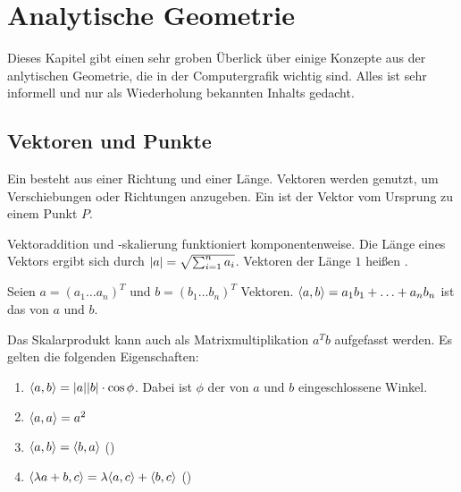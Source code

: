 \chapter{Analytische Geometrie}
Dieses Kapitel gibt einen sehr groben Überlick über einige Konzepte aus der anlytischen Geometrie, die in der Computergrafik wichtig sind.
Alles ist sehr informell und nur als Wiederholung bekannten Inhalts gedacht.

\section{Vektoren und Punkte}
Ein  besteht aus einer Richtung und einer Länge.
Vektoren werden genutzt, um Verschiebungen oder Richtungen anzugeben.
Ein  ist der Vektor vom Ursprung zu einem Punkt $P$.

Vektoraddition und -skalierung funktioniert komponentenweise.
Die Länge eines Vektors ergibt sich durch $\vert a \vert = \sqrt{\sum_{i = 1}^n a_i}$.
Vektoren der Länge $1$ heißen .

\begin{Definition}[Skalarprodukt]
	Seien $a = \left(a_1 \ldots a_n\right)^T$ und $b = \left(b_1 \ldots b_n\right)^T$ Vektoren.
	$\langle a, b \rangle = a_1b_1 + \ldots + a_nb_n$ ist das  von $a$ und $b$.
\end{Definition}

Das Skalarprodukt kann auch als Matrixmultiplikation $a^Tb$ aufgefasst werden.
Es gelten die folgenden Eigenschaften:
\begin{enumerate}[label=(\roman*)]
	\item $\langle a, b \rangle = \vert a \vert \vert b \vert \cdot \cos \phi$.
	Dabei ist $\phi$ der von $a$ und $b$ eingeschlossene Winkel.
	\item $\langle a, a \rangle = a^2$
	\item $\langle a, b \rangle = \langle b, a \rangle$ ()
	\item $\langle \lambda a + b, c \rangle = \lambda \langle a, c \rangle + \langle b, c \rangle$ ()
\end{enumerate}

